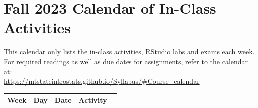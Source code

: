 \documentclass[
]{report}
\begin{document}
\nocite{*}

\hypertarget{fall-2023-calendar-of-in-class-activities}{%
\chapter*{Fall 2023 Calendar of In-Class Activities}\label{fall-2023-calendar-of-in-class-activities}}

This calendar only lists the in-class activities, RStudio labs and exams each week. For required readings as well as due dates for assignments, refer to the calendar at:\\
\url{https://mtstateintrostats.github.io/Syllabus/\#Course_calendar}

\begin{longtable}{|l|l|l|l|p{}|}
\hline
\textbf{Week}& \textbf{Day}& \textbf{Date}& \textbf{Activity} \\ \hline
\endhead


\end{longtable}
\end{document}
